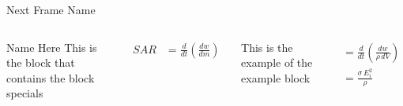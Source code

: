 \documentclass[7pt, aspectratio=169]{beamer}
\begin{document}
\begin{frame}{Next Frame Name}
    \begin{columns}
        \begin{block}{Name Here} 
            This is the block that contains the block specials\\
        \end{block}
        
            \begin{align*}
            SAR &= \frac{d}{dt}\left(\frac{dw}{dm}\right) \\
            \end{align*}

        
        \begin{example} This is the example of the example block
        \end{example}
        
            \begin{align*}
            &= \frac{d}{dt}\left(\frac{dw}{\rho \, dV}\right) \\
            &= \frac{\sigma \, E_i^2}{\rho}
        \end{align*}
        
    \end{columns}
\end{frame}



\end{document}

